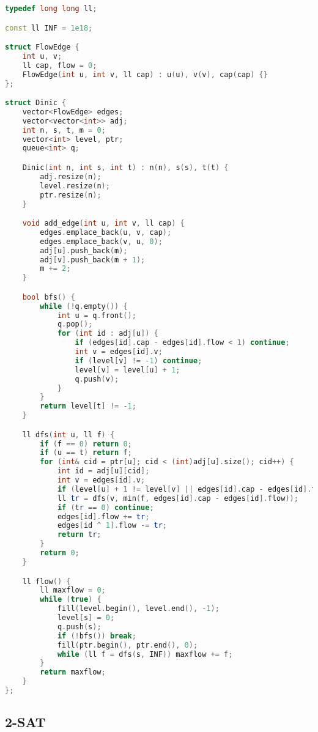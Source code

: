 \documentclass[11pt, a4paper, twoside]{article}
\begin{document}
\begin{lstlisting}[language=C++]
typedef long long ll;

const ll INF = 1e18;

struct FlowEdge {
    int u, v;
    ll cap, flow = 0;
    FlowEdge(int u, int v, ll cap) : u(u), v(v), cap(cap) {}
};

struct Dinic {
    vector<FlowEdge> edges;
    vector<vector<int>> adj;
    int n, s, t, m = 0;
    vector<int> level, ptr;
    queue<int> q;

    Dinic(int n, int s, int t) : n(n), s(s), t(t) {
        adj.resize(n);
        level.resize(n);
        ptr.resize(n);
    }

    void add_edge(int u, int v, ll cap) {
        edges.emplace_back(u, v, cap);
        edges.emplace_back(v, u, 0);
        adj[u].push_back(m);
        adj[v].push_back(m + 1);
        m += 2;
    }

    bool bfs() {
        while (!q.empty()) {
            int u = q.front();
            q.pop();
            for (int id : adj[u]) {
                if (edges[id].cap - edges[id].flow < 1) continue;
                int v = edges[id].v;
                if (level[v] != -1) continue;
                level[v] = level[u] + 1;
                q.push(v);
            }
        }
        return level[t] != -1;
    }

    ll dfs(int u, ll f) {
        if (f == 0) return 0;
        if (u == t) return f;
        for (int& cid = ptr[u]; cid < (int)adj[u].size(); cid++) {
            int id = adj[u][cid];
            int v = edges[id].v;
            if (level[u] + 1 != level[v] || edges[id].cap - edges[id].flow < 1) continue;
            ll tr = dfs(v, min(f, edges[id].cap - edges[id].flow));
            if (tr == 0) continue;
            edges[id].flow += tr;
            edges[id ^ 1].flow -= tr;
            return tr;
        }
        return 0;
    }

    ll flow() {
        ll maxflow = 0;
        while (true) {
            fill(level.begin(), level.end(), -1);
            level[s] = 0;
            q.push(s);
            if (!bfs()) break;
            fill(ptr.begin(), ptr.end(), 0);
            while (ll f = dfs(s, INF)) maxflow += f;
        }
        return maxflow;
    }
};
\end{lstlisting}

\subsection{2-SAT}
\end{document}
